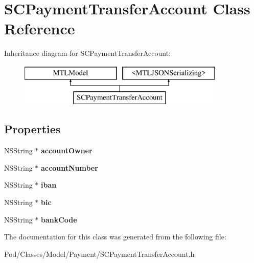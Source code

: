 \hypertarget{interface_s_c_payment_transfer_account}{}\section{S\+C\+Payment\+Transfer\+Account Class Reference}
\label{interface_s_c_payment_transfer_account}
Inheritance diagram for S\+C\+Payment\+Transfer\+Account\+:\begin{figure}[H]
\begin{center}
\leavevmode
\includegraphics[height=2.000000cm]{interface_s_c_payment_transfer_account}
\end{center}
\end{figure}
\subsection*{Properties}
\begin{DoxyCompactItemize}
\item 
N\+S\+String $\ast$ {\bfseries account\+Owner}\hypertarget{interface_s_c_payment_transfer_account_ab23f59e52bb985a99df40ba622342721}{}\label{interface_s_c_payment_transfer_account_ab23f59e52bb985a99df40ba622342721}

\item 
N\+S\+String $\ast$ {\bfseries account\+Number}\hypertarget{interface_s_c_payment_transfer_account_a9e5caa684fc16e007428cdd2492390e9}{}\label{interface_s_c_payment_transfer_account_a9e5caa684fc16e007428cdd2492390e9}

\item 
N\+S\+String $\ast$ {\bfseries iban}\hypertarget{interface_s_c_payment_transfer_account_a1267370073c3d4062c9b27096c0fa8f1}{}\label{interface_s_c_payment_transfer_account_a1267370073c3d4062c9b27096c0fa8f1}

\item 
N\+S\+String $\ast$ {\bfseries bic}\hypertarget{interface_s_c_payment_transfer_account_afe323615bdf164c7bc45085c453a1cae}{}\label{interface_s_c_payment_transfer_account_afe323615bdf164c7bc45085c453a1cae}

\item 
N\+S\+String $\ast$ {\bfseries bank\+Code}\hypertarget{interface_s_c_payment_transfer_account_ae0ec7d14cf23e027b3a42be19fcfc402}{}\label{interface_s_c_payment_transfer_account_ae0ec7d14cf23e027b3a42be19fcfc402}

\end{DoxyCompactItemize}


The documentation for this class was generated from the following file\+:\begin{DoxyCompactItemize}
\item 
Pod/\+Classes/\+Model/\+Payment/S\+C\+Payment\+Transfer\+Account.\+h\end{DoxyCompactItemize}
